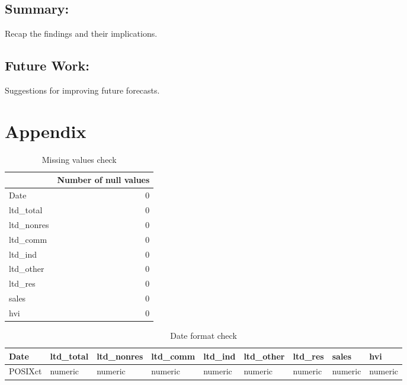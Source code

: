\documentclass[11pt,a4paper,]{article}
\begin{document}
\subsection{Summary:}\label{summary}

Recap the findings and their implications.

\subsection{Future Work:}\label{future-work}

Suggestions for improving future forecasts.

\section{Appendix}\label{appendix}

\begin{table}

\caption{\label{tab:missingval}Missing values check}
\centering
\begin{tabular}[t]{lr}
\toprule
  & Number of null values\\
\midrule
Date & 0\\
ltd\_total & 0\\
ltd\_nonres & 0\\
ltd\_comm & 0\\
ltd\_ind & 0\\
\addlinespace
ltd\_other & 0\\
ltd\_res & 0\\
sales & 0\\
hvi & 0\\
\bottomrule
\end{tabular}
\end{table}

\begin{table}

\caption{\label{tab:dataformat}Date format check}
\centering
\begin{tabular}[t]{lllllllll}
\toprule
Date & ltd\_total & ltd\_nonres & ltd\_comm & ltd\_ind & ltd\_other & ltd\_res & sales & hvi\\
\midrule
POSIXct & numeric & numeric & numeric & numeric & numeric & numeric & numeric & numeric\\
\bottomrule
\end{tabular}
\end{table}
\end{document}
